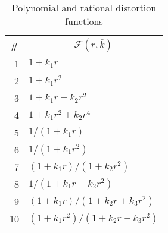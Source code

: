 \begin{table}[t!]
  \centering
  \begin{tabular}{r|l}
  \multicolumn{1}{c|}{\textbf{\#}} & \multicolumn{1}{c}{\textbf{$\mathcal{F}\left( r, \bar{k} \right)$}} \\
    \hline
    1	& $1 + k_1 r$ \\
    2	& $1 + k_1 r^2$ \\
    3	& $1 + k_1 r + k_2 r^2$ \\
    4	& $1 + k_1 r^2 + k_2 r^4$ \\
    5	& $1 / (1 + k_1 r) $ \\
    6	& $1 / (1 + k_1 r^2)$ \\
    7	& $(1 + k_1 r) / (1 + k_2 r^2)$ \\
    8	& $1 / (1 + k_1 r + k_2 r^2)$ \\
    9	& $(1 + k_1 r) / (1 + k_2 r + k_3 r^2)$ \\
    10	& $(1 + k_1 r^2) / (1 + k_2 r + k_3 r^2)$ \\
    \hline
  \end{tabular}
  
  \caption{Polynomial and rational distortion functions}
  \label{tab:dist-funcs}
\end{table}